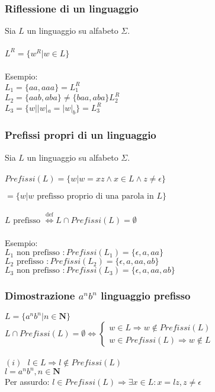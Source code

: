 \documentclass[]{article}
\begin{document}
\subsubsection{Riflessione di un linguaggio}

Sia \mbox{$ L $} un linguaggio su alfabeto \mbox{$ \Sigma $}.
\\
\\
\mbox{$ L^R = \{ w^R | w \in L \} $}
\\
\\
Esempio:
\\
\mbox{$ L_1 = \{ aa, aaa \} = L_1^R $}
\\
\mbox{$ L_2 = \{ aab, aba \} \neq \{ baa, aba \} L_2^R $}
\\
\mbox{$ L_3 = \{ w | |w|_a = |w|_b \} = L_3^R $}



\subsubsection{Prefissi propri di un linguaggio}

Sia \mbox{$ L $} un linguaggio su alfabeto \mbox{$ \Sigma $}.
\\
\\
\mbox{$ Prefissi(L) = \{ w | w = xz \land x \in L \land z \neq \epsilon \} $}

\mbox{$ = \{ w | w \text{ prefisso proprio di una parola in } L \} $}
\\
\\
\mbox{$ L \text{ prefisso } \overset{\text{def}}{\Leftrightarrow}
L \cap Prefissi(L) = \emptyset $}
\\
\\
Esempio:
\\
\mbox{$ L_1 \text{ non prefisso } \colon Prefissi(L_1) = \{ \epsilon, a, aa \} $}
\\
\mbox{$ L_2 \text{ prefisso } \colon Prefissi(L_2) = \{ \epsilon, a, aa, ab \} $}
\\
\mbox{$ L_3 \text{ non prefisso } \colon Prefissi(L_3) = \{ \epsilon, a, aa, ab \} $}



\subsubsection{Dimostrazione \mbox{$ a^nb^n $} linguaggio prefisso}

\mbox{$ L = \{ a^nb^n | n \in \mathbf{N} \} $}
\\
\begin{math}
L \cap Prefissi(L) = \emptyset
\Leftrightarrow
\begin{cases}
w \in L \Rightarrow w \not \in Prefissi(L) \\
w \in Prefissi(L) \Rightarrow w \not \in L
\end{cases}
\end{math}
\\
\\
\mbox{$ (i) \text{ } l \in L \Rightarrow l \not \in Prefissi(L) $}
\\
\mbox{$ l = a^nb^n, n \in \mathbf{N} $}
\\
Per assurdo: \mbox{$ l \in Prefissi(L) \Rightarrow \exists x \in L \colon x = lz, z \neq \epsilon $}
\end{document}
